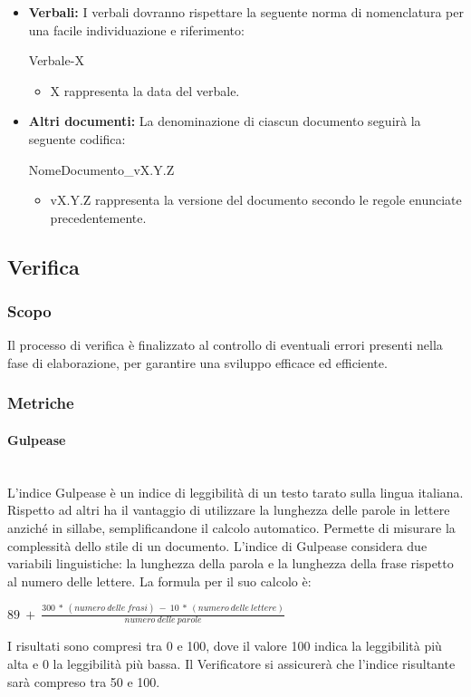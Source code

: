 \documentclass[11pt,a4paper]{article}
\begin{document}
\begin{itemize}
\item \textbf{Verbali:} I verbali dovranno rispettare la seguente norma di nomenclatura per una facile individuazione e riferimento:
\begin{center}
	Verbale-X
\end{center}

\begin{itemize}
	\item X rappresenta la data del verbale.
\end{itemize}

\item \textbf{Altri documenti:} La denominazione di ciascun documento seguirà la seguente codifica:
\begin{center}
	NomeDocumento\_vX.Y.Z
\end{center}

\begin{itemize}
	\item vX.Y.Z rappresenta la versione del documento secondo le regole enunciate precedentemente.
\end{itemize}

\end{itemize}

\newpage

\subsection{Verifica}

\subsubsection{Scopo}
Il processo di verifica è finalizzato al controllo di eventuali errori presenti nella fase di elaborazione, per garantire una sviluppo efficace ed efficiente.



\subsubsection{Metriche}
\paragraph{Gulpease}
\noindent \\ 
L'indice Gulpease è un indice di leggibilità di un testo tarato sulla lingua italiana. Rispetto ad altri ha il vantaggio di utilizzare la lunghezza delle parole in lettere anziché in sillabe, semplificandone il calcolo automatico. Permette di misurare la complessità dello stile di un documento. L'indice di Gulpease considera due variabili linguistiche: la lunghezza della parola e la lunghezza della frase rispetto al numero delle lettere. La formula per il suo calcolo è:
\begin{center}
	$89\ +\ \frac{300\ *\ (numero\ delle\ frasi)\ -\ 10\ *\ (numero\ delle\ lettere)}{numero\ delle\ parole}$
\end{center}
I risultati sono compresi tra 0 e 100, dove il valore 100 indica la leggibilità più alta e 0 la leggibilità più bassa. Il Verificatore si assicurerà che l'indice risultante sarà compreso tra 50 e 100.
\end{document}
